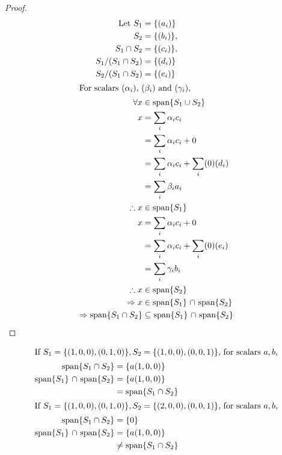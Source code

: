 \documentclass[12pt]{article}
\newenvironment{problem}[2][Problem]{\begin{trivlist}
\item[\hskip \labelsep {\bfseries #1}\hskip \labelsep {\bfseries #2.}]}{\end{trivlist}}
\begin{document}
\begin{problem}{15}
\end{problem}
\begin{proof}
\begin{align*}
\text{Let }S_1 &= \{ (a_i) \} \\
S_2 &= \{ (b_i) \}, \\
S_1 \cap S_2 &= \{(c_i)\}, \\
S_1 / (S_1 \cap S_2) &= \{ (d_i)\} \\
S_2 / (S_1 \cap S_2) &= \{ (e_i)\} \\
\intertext{For scalars $(\alpha_i)$, $(\beta_i)$ and $(\gamma_i)$,}
\forall x &\in \text{span\{$S_1 \cup S_2$\}} \\
x &= \sum_{i} \alpha_i c_i \\
&= \sum_{i} \alpha_i c_i + 0 \\
&= \sum_{i} \alpha_i c_i + \sum_{i} (0) (d_i) \\
&= \sum_{i} \beta_i a_i \\
\therefore x &\in \text{span\{$S_1$\}} \\
x &= \sum_{i} \alpha_i c_i + 0 \\
&= \sum_{i} \alpha_i c_i + \sum_{i} (0) (e_i) \\
&= \sum_{i} \gamma_i b_i \\
\therefore x &\in \text{span\{$S_2$\}} \\
\Rightarrow x &\in \text{span\{$S_1$\} $\cap$ span\{$S_2$\}} \\
\Rightarrow \text{span\{$S_1 \cap S_2$\}} &\subseteq
\text{span\{$S_1$\} $\cap$ span\{$S_2$\}} \\
\end{align*}
\end{proof}
\begin{align*}
\intertext{If $S_1 = \{ (1,0,0), (0,1,0) \}, S_2 = \{ (1,0,0) , (0,0,1)\}$, 
	for scalars $a, b$,}
\text{span\{$S_1 \cap S_2$\}} &= \{ a(1,0,0) \} \\ 
\text{span\{$S_1$\} $\cap$ span\{$S_2$\}} &= \{ a(1,0,0) \} \\ 
&= \text{span\{$S_1 \cap S_2$\}} \\ 
\intertext{If $S_1 = \{ (1,0,0), (0,1,0) \}, S_2 = \{ (2,0,0) , (0,0,1)\}$, 
	for scalars $a, b$,}
\text{span\{$S_1 \cap S_2$\}} &= \{ 0 \} \\ 
\text{span\{$S_1$\} $\cap$ span\{$S_2$\}} &= \{ a(1,0,0) \} \\ 
&\ne \text{span\{$S_1 \cap S_2$\}} \\ 
\end{align*}
\filbreak
\end{document}
